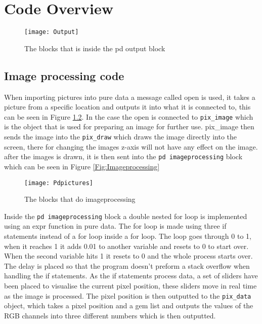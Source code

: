 \chapter{Code Overview}\label{ch:codeoverview}


\begin{figure}
\centering
\texttt{[image: Output]}
\caption{The blocks that is inside the pd output block}
\label{Fig:Output}
\end{figure}

\section{Image processing code}
When importing pictures into pure data a message called open is used, it takes a picture from a specific location and outputs it into what it is connected to, this can be seen in Figure \ref{Fig:pdpicture}. In the case the open is connected to \texttt{pix\_image} which is the object that is used for preparing an image for further use. pix\_image then sends the image into the \texttt{pix\_draw} which draws the image directly into the screen, there for changing the images z-axis will not have any effect on the image. after the images is drawn, it is then sent into the \texttt{pd imageprocessing} block which can be seen in Figure \ref{Fig:Imageprocessing} 

\begin{figure}
\centering
\texttt{[image: Pdpictures]}
\caption{The blocks that do imageprocessing}
\label{Fig:pdpicture}
\end{figure}

Inside the \texttt{pd imageprocessing} block a double nested for loop is implemented using an expr function in pure data. The for loop is made using three if statements instead of a for loop inside a for loop. The loop goes through 0 to 1, when it reaches 1 it adds 0.01 to another variable and resets to 0 to start over. When the second variable hits 1 it resets to 0 and the whole process starts over. The delay is placed so that the program doesn't preform a stack overflow when handling the if statements. 
As the if statements process data, a set of sliders have been placed to visualise the current pixel position, these sliders move in real time as the image is processed. The pixel position is then outputted to the \texttt{pix\_data} object, which takes a pixel position and a gem list and outputs the values of the RGB channels into three different numbers which is then outputted. 

